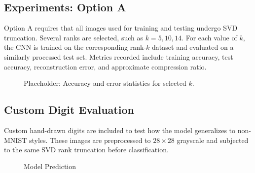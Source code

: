 \documentclass[11pt]{article}
\begin{document}
\subsection*{Experiments: Option A}
Option A requires that all images used for training and testing undergo SVD truncation. Several ranks are selected, such as \(k = 5, 10, 14\). For each value of \(k\), the CNN is trained on the corresponding rank-\(k\) dataset and evaluated on a similarly processed test set. Metrics recorded include training accuracy, test accuracy, reconstruction error, and approximate compression ratio.

\begin{figure}[h]
\centering
{}
\caption*{Placeholder: Accuracy and error statistics for selected \(k\).}
\end{figure}

\pagebreak{}
\subsection*{Custom Digit Evaluation}
Custom hand-drawn digits are included to test how the model generalizes to non-MNIST styles. These images are preprocessed to \(28 \times 28\) grayscale and subjected to the same SVD rank truncation before classification.

\begin{figure}[h]
\centering
\begin{minipage}{0.3\textwidth}
    \centering
    \caption*{Custom Original}
\end{minipage}
\hfill
\begin{minipage}{0.3\textwidth}
    \centering
    \caption*{Rank 10 Reconstruction}
\end{minipage}
\hfill
\begin{minipage}{0.3\textwidth}
    \centering
    \caption*{Model Prediction}
\end{minipage}
\end{figure}
\end{document}
